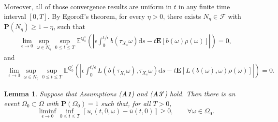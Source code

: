 \documentclass[11pt,reqno]{amsart}
\newtheorem{lem}[thm]{Lemma}
\theoremstyle{definition}
\theoremstyle{remark}
\numberwithin{equation}{section}
\def\bP{\mathbf{P}}
\begin{document}
Moreover, all of those convergence results are uniform in $t$ in any finite time interval $[0,T]$.
By Egoroff's theorem, for every $\eta >0$, there exists $N_{\eta} \in\mathscr{F}$ with $\bP(N_{\eta})\geq 1-\eta$, such that
\begin{align}\label{ELE1}
     \lim_{\epsilon\rightarrow 0}\sup_{\omega\in N_{\eta}}\sup_{0\leq t \leq T}\mathbb{E}^{Q^{c}_{0}}\left(\left|\epsilon\int^{t/\epsilon}_{0}b(\tau_{X_{s}}\omega)\mathrm{d}s - t\mathbf{E}[b(\omega)\rho(\omega)] \right| \right)= 0,
\end{align}
and 
\begin{align}\label{ELE2}
    \lim_{\epsilon\rightarrow 0}\sup_{\omega\in N_{\eta}}\sup_{0\leq t \leq T}\mathbb{E}^{Q^{c}_{0}}\left(\left|\epsilon\int^{t/\epsilon}_{0}L(b(\tau_{X_{s}}\omega),\tau_{X_{s}}\omega)\mathrm{d}s - t\mathbf{E}[L(b(\omega),\omega)\rho(\omega)]\right| \right) =  0.
\end{align}


\begin{lem}\label{Con3}
Suppose that Assumptions {\upshape({\bf A1})} and {\upshape({\bf A3$'$})} hold. Then there is an event $\Omega_0 \subset \Omega$ with $\mathbf{P}(\Omega_0) = 1$ such that, for all $T>0$,
\begin{equation}\label{Eu00}
    \liminf_{\epsilon\rightarrow 0} %
    \inf_{0\leq t \leq T} \,[u_{\epsilon}(t,0,\omega) - \overline{u}(t,0)] \ge 0, \qquad \forall \omega \in \Omega_0.
\end{equation}
\end{lem}
\end{document}
